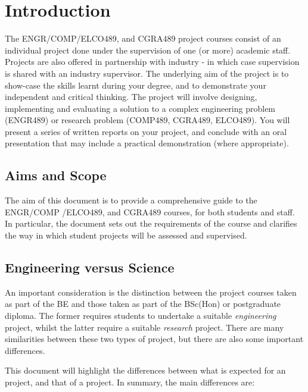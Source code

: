 \chapter{Introduction}
The ENGR/COMP/ELCO489, and CGRA489 project courses consist of an individual project
done under the supervision of one (or more) academic staff.  Projects
are also offered in partnership with industry - in which case
supervision is shared with an industry supervisor.     The underlying
aim of the project is to show-case the skills learnt during your degree, and to
demonstrate your independent and critical thinking.  The project will involve
designing, implementing and evaluating a solution to a complex engineering
problem (ENGR489) or research problem (COMP489, CGRA489, ELCO489).  You
will present a series of written reports on your project, and conclude with
an oral presentation that may include a practical demonstration (where
appropriate).

\section{Aims and Scope}
The aim of this document is to provide a comprehensive guide to the ENGR/COMP
/ELCO489, and CGRA489 courses, for both students and staff. In
particular, the document sets out the requirements of the course and clarifies the way in which student projects 
will be assessed and supervised.

\section{Engineering versus Science}
An important consideration is the distinction between the project
courses taken as part of the BE and those taken as part of the BSc(Hon)
or postgraduate diploma.
The former requires students to undertake a suitable {\em engineering} project,
whilst the latter require a suitable {\em research} project.  There are many
similarities between these two types of project, but there are also some
important differences.

This document will highlight the differences between what is expected for an
\engr project, and that of a \bsc project.  In summary, the main differences
are:

